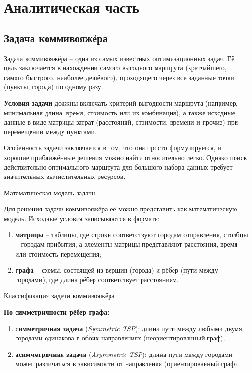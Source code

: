 \section{Аналитическая часть}

\subsection{Задача коммивояжёра}

\hspace{1.25cm}
Задача коммивояжёра -- одна из самых известных оптимизационных задач. Её цель заключается в нахождении самого выгодного маршрута (кратчайшего, самого быстрого, наиболее дешёвого), проходящего через все заданные точки (пункты, города) по одному разу. 

\textbf{Условия задачи} должны включать критерий выгодности маршрута (например, минимальная длина, время, стоимость или их комбинация), а также исходные данные в виде матрицы затрат (расстояний, стоимости, времени и прочие) при перемещении между пунктами. 

Особенность задачи заключается в том, что она просто формулируется, и хорошие приближённые решения можно найти относительно легко. Однако поиск действительно оптимального маршрута для большого набора данных требует значительных вычислительных ресурсов.

\underline{Математическая модель задачи}

Для решения задачи коммивояжёра её можно представить как математическую модель. Исходные условия записываются в формате:
\begin{enumerate}[label=\arabic*)]
    \item \textbf{матрицы} -- таблицы, где строки соответствуют городам отправления, столбцы -- городам прибытия, а элементы матрицы представляют расстояния, время или стоимость перемещения;
    \item \textbf{графа} -- схемы, состоящей из вершин (города) и рёбер (пути между городами), где длина рёбер соответствует расстояниям.
\end{enumerate}

\underline{Классификация задачи коммивояжёра}

\textbf{По симметричности рёбер графа:}
\begin{enumerate}[label=\arabic*)]
    \item \textbf{симметричная задача} (\textit{Symmetric TSP}): длина пути между любыми двумя городами одинакова в обоих направлениях (неориентированный граф);
    \item \textbf{асимметричная задача} (\textit{Asymmetric TSP}): длина пути между городами может различаться в зависимости от направления (ориентированный граф).
\end{enumerate}

